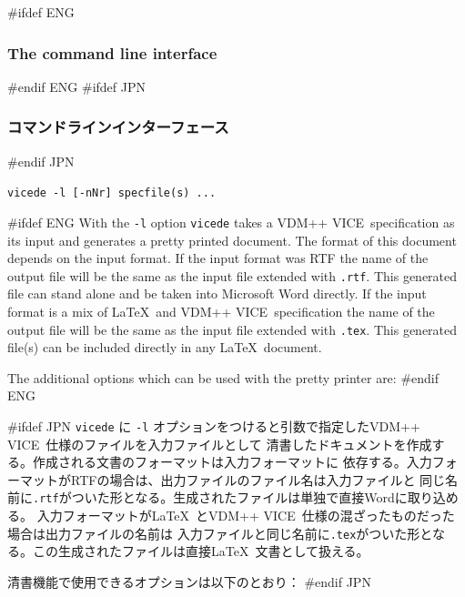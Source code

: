 \documentclass[\pformat,12pt]{article}
\newcommand{\vdmslpp}{VDM-SL}
\newcommand{\vdmde}{vdmde}
\newcommand{\vdmslpp}{VDM++}
\newcommand{\vdmde}{vppde}
\renewcommand{\vdmslpp}{VDM++ VICE}
\renewcommand{\vdmde}{vicede}
\begin{document}
#ifdef ENG
\subsubsection{The command line interface} \label{vdm2tex}
#endif ENG
#ifdef JPN
\subsubsection{コマンドラインインターフェース} \label{vdm2tex}
#endif JPN

{\tt \vdmde\ -l [-nNr] specfile(s) ...}

\vspace{0.5cm}

\noindent
#ifdef ENG
With the {\tt -l} option {\tt \vdmde} takes a \vdmslpp\
specification as its input and generates a pretty printed
document. The format of this document depends on the
input format. If the input format was RTF the name of the output file
will be the same as the input file extended with {\tt .rtf}. This
generated file can stand alone and be taken into Microsoft Word
directly. If the input format is a mix of \LaTeX\ and \vdmslpp\ 
specification the name of the output file will be the same as the
input file extended with {\tt .tex}. This generated file(s) can be
included directly in any \LaTeX\ document.

The additional options which can be used with the pretty printer are:
#endif ENG

#ifdef JPN
{\tt \vdmde} に {\tt -l} オプションをつけると引数で指定した\vdmslpp\ 仕様のファイルを入力ファイルとして
清書したドキュメントを作成する。作成される文書のフォーマットは入力フォーマットに
依存する。入力フォーマットがRTFの場合は、出力ファイルのファイル名は入力ファイルと
同じ名前に{\tt .rtf}がついた形となる。生成されたファイルは単独で直接Wordに取り込める。
入力フォーマットが\LaTeX\ と\vdmslpp\ 仕様の混ざったものだった場合は出力ファイルの名前は
入力ファイルと同じ名前に{\tt .tex}がついた形となる。この生成されたファイルは直接\LaTeX\ 
文書として扱える。

清書機能で使用できるオプションは以下のとおり：
#endif JPN
\end{document}
